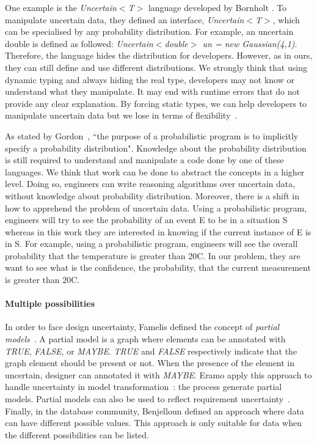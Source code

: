 One example is the \textit{Uncertain$<$T$>$} language developed by Bornholt \etal \cite{DBLP:conf/asplos/BornholtMM14}.
To manipulate uncertain data, they defined an interface, \textit{Uncertain$<$T$>$}, which can be specialised by any probability distribution.
For example, an uncertain double is defined as followed: \textit{Uncertain$<$double$>$ un = new Gaussian(4,1)}.
Therefore, the language hides the distribution for developers.
However, as in ours, they can still define and use different distributions.
We strongly think that using dynamic typing and always hiding the real type, developers may not know or understand what they manipulate.
It may end with runtime errors that do not provide any clear explanation.
By forcing static types, we can help developers to manipulate uncertain data but we lose in terms of flexibility~\cite{Meijer2004StaticTW}.

As stated by Gordon~\etal\cite{DBLP:conf/icse/GordonHNR14}, ``the purpose of a probabilistic program is to implicitly specify a probability distribution".
Knowledge about the probability distribution is still required to understand and manipulate a code done by one of these languages.
We think that work can be done to abstract the concepts in a higher level.
Doing so, engineers can write reasoning algorithms over uncertain data, without knowledge about probability distribution.
Moreover, there is a shift in how to apprehend the problem of uncertain data.
Using a probabilistic program, engineers will try to see the probability of an event E to be in a situation S whereas in this work they are interested in knowing if the current instance of E is in S.
For example, using a probabilistic program, engineers will see the overall probability that the temperature is greater than 20\degree{}C.
In our problem, they are want to see what is the confidence, \ie the probability, that the current measurement is greater than 20\degree{}C.

\paragraph{Multiple possibilities}
In order to face design uncertainty, Famelis \etal defined the concept of \textit{partial models}~\cite{DBLP:conf/icse/FamelisSC12, DBLP:journals/sosym/FamelisC19}.
A partial model is a graph where elements can be annotated with \textit{TRUE}, \textit{FALSE}, or \textit{MAYBE}.
\textit{TRUE} and \textit{FALSE} respectively indicate that the graph element should be present or not.
When the presence of the element in uncertain, designer can annotated it with \textit{MAYBE}.
Eramo \etal apply this approach to handle uncertainty in model transformation~\cite{DBLP:conf/sle/EramoPR15, DBLP:conf/icse/EramoPR14}: the process generate partial models.
Partial models can also be used to reflect requirement uncertainty~\cite{DBLP:journals/re/SalayCHS13}.
Finally, in the database community, Benjelloun \etal \cite{DBLP:conf/vldb/BenjellounSHW06} defined an approach where data can have different possible values.
This approach is only suitable for data when the different possibilities can be listed.

